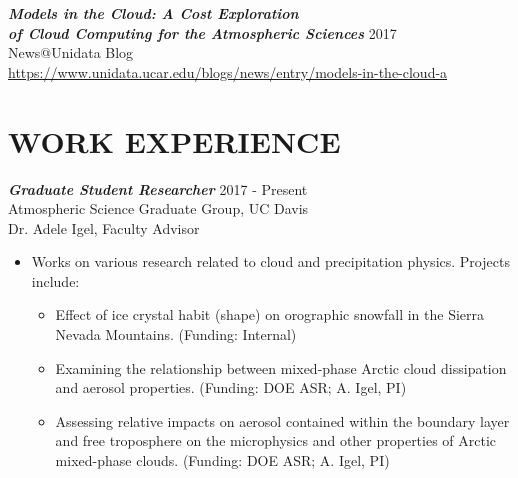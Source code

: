 \documentclass[overlapped]{res}
\begin{document}
\begin{resume}
    
    {\sl \textbf{Models in the Cloud: A Cost Exploration \\ of Cloud Computing for the Atmospheric Sciences}} \hfill 2017 \\
    News@Unidata Blog \\
    \href{https://www.unidata.ucar.edu/blogs/news/entry/models-in-the-cloud-a}{https://www.unidata.ucar.edu/blogs/news/entry/models-in-the-cloud-a}
    
    
\newpage
\section{WORK EXPERIENCE} 


                {\sl \textbf{Graduate Student Researcher}} \hfill 2017 - Present \\
                Atmospheric Science Graduate Group, UC Davis \\
                Dr. Adele Igel, Faculty Advisor \\
                \begin{itemize}
                    \item Works on various research related to cloud and precipitation physics. Projects include:
                    \begin{itemize} \itemsep -2pt
                        \item Effect of ice crystal habit (shape) on orographic snowfall in the Sierra Nevada Mountains. (Funding: Internal)
                        \item Examining the relationship between mixed-phase Arctic cloud dissipation and aerosol properties. (Funding: DOE ASR; A. Igel, PI) 
                        \item Assessing relative impacts on aerosol contained within the boundary layer and free troposphere on the microphysics and other properties of Arctic mixed-phase clouds. (Funding: DOE ASR; A. Igel, PI)
                    \end{itemize}
                \end{itemize}


\end{resume}
\end{document}
